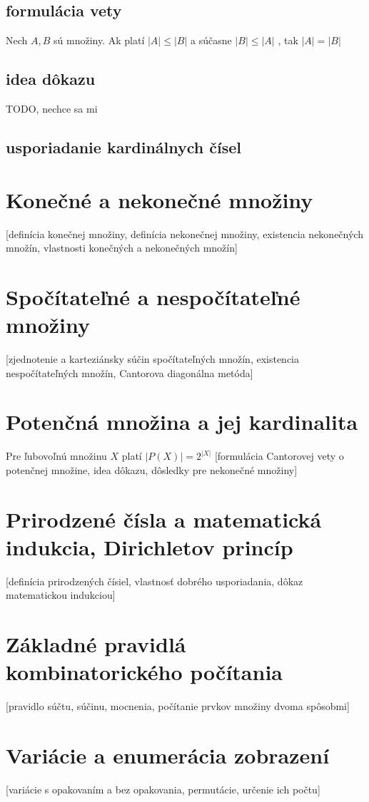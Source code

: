  	\subsection{formulácia vety}
 	Nech $A, B$ sú množiny. Ak platí $|A| \leq |B|$ a súčasne $|B| \leq |A|$ , tak $|A| = |B|$
 	\subsection{idea dôkazu}
 	TODO, nechce sa mi
 	\subsection{usporiadanie kardinálnych čísel}

\section {Konečné a nekonečné množiny}
  [definícia konečnej množiny, definícia nekonečnej množiny, existencia nekonečných množín, vlastnosti konečných a nekonečných množín]

\section {Spočítateľné a nespočítateľné množiny}
  [zjednotenie a karteziánsky súčin spočítateľných množín, existencia nespočítateľných množín, Cantorova diagonálna metóda]

\section {Potenčná množina a jej kardinalita}
	Pre ľubovoľnú množinu $X$ platí $|P (X)| = 2^{|X|}$
  [formulácia Cantorovej vety o potenčnej množine, idea dôkazu, dôsledky pre nekonečné množiny] 

\section {Prirodzené čísla a matematická indukcia, Dirichletov princíp}
  [definícia prirodzených čísiel, vlastnosť dobrého usporiadania, dôkaz matematickou indukciou]

\section {Základné pravidlá kombinatorického počítania}
  [pravidlo súčtu, súčinu, mocnenia, počítanie prvkov množiny dvoma spôsobmi] 

\section {Variácie a enumerácia zobrazení}
  [variácie s opakovaním a bez opakovania, permutácie, určenie ich počtu] 

